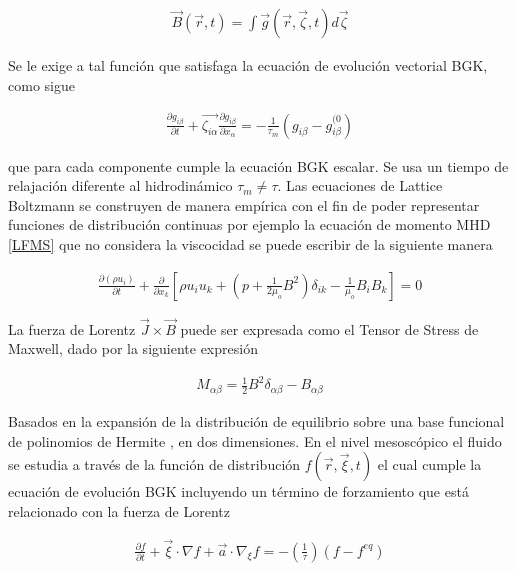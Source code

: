 \begin{eqnarray}
    \vec{B}(\vec{r},t) = \int \vec{g}(\vec{r},\vec{\zeta},t)d\vec{\zeta}
\end{eqnarray}

\noindent Se le exige a tal función que satisfaga la ecuación de evolución vectorial BGK, como sigue

\begin{eqnarray}
    \label{LBMHD}
    \frac{\partial g_{i\beta}}{\partial t} + \vec{\zeta_{i\alpha}}\frac{\partial g_{i\beta}}{\partial x_{\alpha}} = -\frac{1}{\tau_{m}}(g_{i\beta}-g_{i\beta}^{(0})
\end{eqnarray}

\noindent que para cada componente cumple la ecuación BGK escalar. Se usa un tiempo de relajación diferente al hidrodinámico $\tau_{m} \neq \tau$. Las ecuaciones de Lattice Boltzmann se construyen de manera empírica con el fin de poder representar funciones de distribución continuas por ejemplo la ecuación de momento MHD \eqref{LFMS} que no considera la viscocidad se puede escribir de la siguiente manera

\begin{eqnarray}
    \frac{\partial(\rho u_{i})}{\partial t}+\frac{\partial}{\partial x_{k}}\left[\rho u_{i}u_{k}+\left(p+\frac{1}{2\mu_{o}}B^{2}\right)\delta_{ik}-\frac{1}{\mu_{o}}B_{i}B_{k}\right] = 0
\end{eqnarray}

\noindent La fuerza de Lorentz $\vec{J}\times\vec{B}$ puede ser expresada como el Tensor de Stress de Maxwell, dado por la siguiente expresión

\begin{eqnarray}
    M_{\alpha\beta} = \frac{1}{2}B^{2}\delta_{\alpha\beta}-B_{\alpha\beta}
\end{eqnarray}

\noindent Basados en la expansión de la distribución de equilibrio sobre una base funcional de polinomios de Hermite \cite{kruger}\cite{Dellar} , en dos dimensiones. En el nivel mesoscópico el fluido se estudia a través de la función de distribución $f(\vec{r},\vec{\xi},t)$ el cual cumple la ecuación de evolución BGK incluyendo un término de forzamiento que está relacionado con la fuerza de Lorentz

\begin{eqnarray}
    \frac{\partial f}{\partial t} + \vec{\xi}\cdot\nabla f + \vec{a}\cdot\nabla_{\xi}f=-\left(\frac{1}{\tau}\right)(f-f^{eq})
\end{eqnarray}

